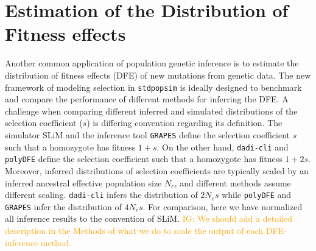 \documentclass[hidelinks]{article}
\newcommand{\stdpopsim}{\texttt{stdpopsim}\xspace}
\newcommand{\polydfe}{\texttt{polyDFE}\xspace}
\newcommand{\dadicli}{\texttt{dadi-cli}\xspace}
\newcommand{\grapes}{\texttt{GRAPES}\xspace}
\newcommand{\igcomment}[1]{\textcolor{orange}{IG: #1}}
\begin{document}
\section*{Estimation of the Distribution of Fitness effects}
    \label{dfe}
    Another common application of population genetic inference is to estimate the distribution of fitness effects (DFE) of new mutations
    from genetic data. The new framework of modeling selection in \stdpopsim is ideally designed to benchmark and compare
    the performance of different methods for inferring the DFE. 
    A challenge when comparing different inferred and simulated distributions of the selection coefficient ($s$) is differing convention regarding its definition.
    The simulator SLiM and the inference tool \grapes define the selection coefficient $s$ such that a homozygote has fitness $1+s$.
    On the other hand, \dadicli and \polydfe define the selection coefficient such that a homozygote has fitness $1+ 2s$.
    Moreover, inferred distributions of selection coefficients are typically scaled by an inferred ancestral
    effective population size $N_e$, and different methods assume different scaling.
    \dadicli infers the distribution of $2 N_e s$ while \polydfe and \grapes infer the distribution of $4 N_e s$.
    For comparison, here we have normalized all inference results to the convention of SLiM.
    \igcomment{We should add a detailed description in the Methods of what we do to scale the output of each DFE-inference method.}
           		
\end{document}
